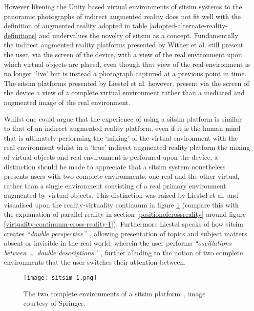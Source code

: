 However likening the Unity based virtual environments of sitsim systems to the panoramic photographs of indirect augmented reality does not fit well with the definition of augmented reality adopted in table \ref{adopted-alternate-reality-definitions} and undervalues the novelty of sitsim as a concept. Fundamentally the indirect augmented reality platforms presented by Wither et al. still present the user, via the screen of the device, with a view of the real environment upon which virtual objects are placed, even though that view of the real environment is no longer `live' but is instead a photograph captured at a previous point in time. The sitsim platforms presented by Liest\o l et al. however, present via the screen of the device a view of a complete virtual environment rather than a mediated and augmented image of the real environment.

Whilst one could argue that the experience of using a sitsim platform is similar to that of an indirect augmented reality platform, even if it is the human mind that is ultimately performing the `mixing' of the virtual environment with the real environment whilst in a `true' indirect augmented reality platform the mixing of virtual objects and real environment is performed upon the device, a distinction should be made to appreciate that a sitsim system nonetheless presents users with two complete environments, one real and the other virtual, rather than a single environment consisting of a real primary environment augmented by virtual objects. This distinction was raised by Liest\o l et al. and visualised upon the reality-virtuality continuum in figure \ref{sitsim-1.png} (compare this with the explanation of parallel reality in section \ref{positionofcrossreality} around figure \ref{virtuality-continuum-cross-reality-1}). Furthermore Liest\o l speaks of how sitsim creates \textit{``double perspective''}~\cite{Liestøl2009}, allowing presentation of topics and subject matters absent or invisible in the real world, wherein the user performs \textit{``oscillations between \ldots\ double descriptions''}~\cite{Liestøl2014}, further alluding to the notion of two complete environments that the user switches their attention between.

\begin{figure}[h]
\centering
  \texttt{[image: sitsim-1.png]}
  \caption{The two complete environments of a sitsim platform~\cite{Liestøl2011}, image courtesy of Springer.}
  \label{sitsim-1.png}
\end{figure}

